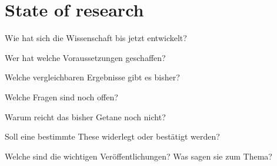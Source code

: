 \section{State of research}
\label{sec:state_of_research}

Wie hat sich die Wissenschaft bis jetzt entwickelt?

Wer hat welche Voraussetzungen geschaffen?

Welche vergleichbaren Ergebnisse gibt es bisher?

Welche Fragen sind noch offen?

Warum reicht das bisher Getane noch nicht?

Soll eine bestimmte These widerlegt oder bestätigt werden?

Welche sind die wichtigen Veröffentlichungen? Was sagen sie zum Thema?